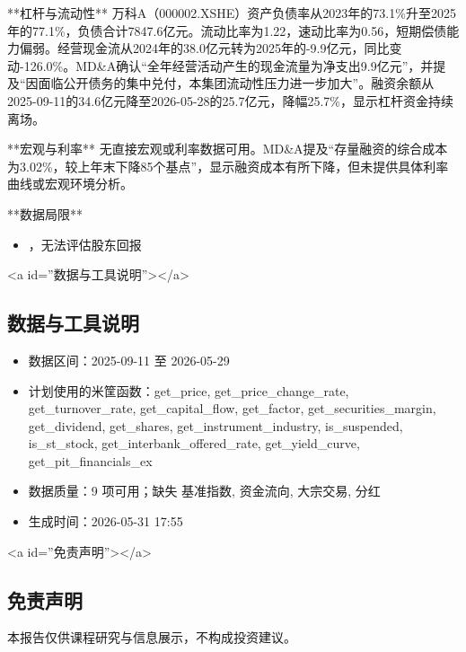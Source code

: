 \documentclass[12pt,a4paper]{article}
\begin{document}
**杠杆与流动性**
万科A（000002.XSHE）资产负债率从2023年的73.1\%升至2025年的77.1\%，负债合计7847.6亿元。流动比率为1.22，速动比率为0.56，短期偿债能力偏弱。经营现金流从2024年的38.0亿元转为2025年的-9.9亿元，同比变动-126.0\%。MD\&A确认“全年经营活动产生的现金流量为净支出9.9亿元”，并提及“因面临公开债务的集中兑付，本集团流动性压力进一步加大”。融资余额从2025-09-11的34.6亿元降至2026-05-28的25.7亿元，降幅25.7\%，显示杠杆资金持续离场。

**宏观与利率**
无直接宏观或利率数据可用。MD\&A提及“存量融资的综合成本为3.02\%，较上年末下降85个基点”，显示融资成本有所下降，但未提供具体利率曲线或宏观环境分析。

**数据局限**

\begin{itemize}
\item ，无法评估股东回报
\end{itemize}

<a id=''数据与工具说明''></a>

\subsection{ 数据与工具说明}
\begin{itemize}
\item 数据区间：2025-09-11 至 2026-05-29
\item 计划使用的米筐函数：get\_price, get\_price\_change\_rate, get\_turnover\_rate, get\_capital\_flow, get\_factor, get\_securities\_margin, get\_dividend, get\_shares, get\_instrument\_industry, is\_suspended, is\_st\_stock, get\_interbank\_offered\_rate, get\_yield\_curve, get\_pit\_financials\_ex
\item 数据质量：9 项可用；缺失 基准指数, 资金流向, 大宗交易, 分红
\item 生成时间：2026-05-31 17:55
\end{itemize}

<a id=''免责声明''></a>

\subsection{ 免责声明}
本报告仅供课程研究与信息展示，不构成投资建议。
\end{document}
